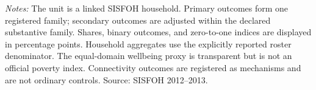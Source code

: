 \begin{minipage}{0.98\linewidth}\footnotesize\textit{Notes:} The unit is a linked SISFOH household. Primary outcomes form one registered family; secondary outcomes are adjusted within the declared substantive family. Shares, binary outcomes, and zero-to-one indices are displayed in percentage points. Household aggregates use the explicitly reported roster denominator. The equal-domain wellbeing proxy is transparent but is not an official poverty index. Connectivity outcomes are registered as mechanisms and are not ordinary controls. Source: SISFOH 2012--2013.\end{minipage}
\par{}\par\endgroup
